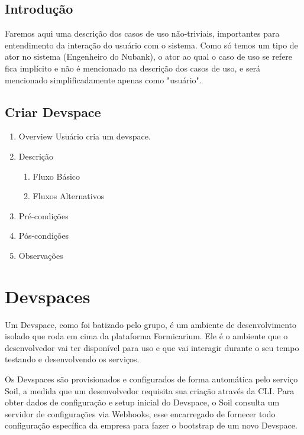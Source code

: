 \documentclass[twosideprint]{politex}
\begin{document}
	\subsection{Introdução}
	Faremos aqui uma descrição dos casos de uso não-triviais, importantes para entendimento da interação do usuário com o sistema. Como só temos um tipo de ator no sistema (Engenheiro do Nubank), o ator ao qual o caso de uso se refere fica implícito e não é mencionado na descrição dos casos de uso, e será mencionado simplificadamente apenas como "usuário".
	\subsection{Criar Devspace}
	   \begin{enumerate}
           \item Overview\newline
           Usuário cria um devspace.
           \item Descrição
           \begin{enumerate}
               \item Fluxo Básico
               \item Fluxos Alternativos
           \end{enumerate}
           \item Pré-condições
           \item Pós-condições
           \item Observações
       \end{enumerate}
		
    \section{Devspaces}
    
    Um Devspace, como foi batizado pelo grupo, é um ambiente de desenvolvimento isolado que roda em cima da plataforma Formicarium. Ele é o ambiente que o desenvolvedor vai ter disponível para uso e que vai interagir durante o seu tempo testando e desenvolvendo os serviços. 
    
    Os Devspaces são provisionados e configurados de forma automática pelo serviço Soil, a medida que um desenvolvedor requisita sua criação através da CLI. Para obter dados de configuração e setup inicial do Devspace, o Soil consulta um servidor de configurações via Webhooks, esse encarregado de fornecer todo configuração específica da empresa para fazer o bootstrap de um novo Devspace.
    
\end{document}
